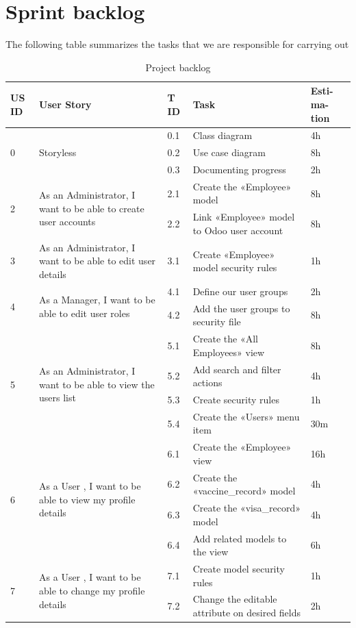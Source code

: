 \section{Sprint backlog}
The following table summarizes the tasks that we are responsible for carrying out 
\begin{center}
\begin{longtable}{|p{1cm}|p{}|p{}|p{}|p{}|}
\caption{ Project backlog }
\hline
\textbf{US ID} 
&\textbf{User Story}
&\textbf{T ID}
&\textbf{Task}
&\textbf{Esti- ma- tion}
\\
\hline
\multirow{ 3}{*}{0}
&\multirow{3}{*}{Storyless}
&0.1
&Class diagram
&4h\\\cline{3-5}
&
&0.2
&Use case diagram
&8h\\\cline{3-5}
&
&0.3
&Documenting progress
&2h\\\cline{3-5}
\hline
\multirow{2}{*}{2}
&\multirow{2}{=}{As an Administrator, I want to be able to create user accounts}
&2.1
&Create the «Employee» model
&8h\\\cline{3-5}
&
&2.2
&Link «Employee» model to Odoo user account
&8h\\\cline{3-5}

\hline
3
&As an Administrator, I want to be able to edit user details
&3.1
&Create «Employee» model security rules
&1h
\\\hline


\multirow{ 2}{*}{4}
&\multirow{2}{=}{As a Manager, I want to be able to edit user roles}
&4.1
&Define our user groups
&2h\\\cline{3-5}
&
&4.2
&Add the user groups to security file
&8h\\\cline{3-5}
\hline


\multirow{ 4}{*}{5}
&\multirow{4}{=}{As an Administrator, I want to be able to view the users list}
&5.1
&Create the «All Employees» view
&8h\\\cline{3-5}
&
&5.2
&Add search and filter actions
&4h\\\cline{3-5}
&
&5.3
&Create security rules
&1h\\\cline{3-5}
&
&5.4
&Create the «Users» menu item
&30m\\\cline{3-5}

\hline


\multirow{4}{*}{6}
&\multirow{4}{=}{As a User , I want to be able to view my profile details}
&6.1
&Create the «Employee» view
&16h\\\cline{3-5}
&
&6.2
&Create the «vaccine\_record» model
&4h\\\cline{3-5}
&
&6.3
&Create the «visa\_record» model
&4h\\\cline{3-5}
&
&6.4
&Add related models to the view
&6h\\\cline{3-5}

\hline

\multirow{2}{*}{7}
&\multirow{2}{=}{As a User , I want to be able to change my profile details}
&7.1
&Create model security rules
&1h\\\cline{3-5}
&
&7.2
&Change the editable attribute on desired fields
&2h\\\cline{3-5}

\hline
\end{longtable}
\end{center}
